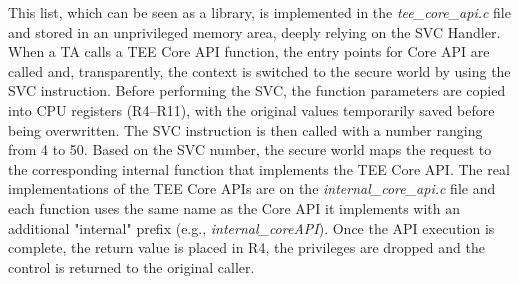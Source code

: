 \documentclass{article}
\begin{document}
This list, which can be seen as a library, is implemented in the \textit{tee\_core\_api.c} file and stored in an unprivileged memory area, deeply relying on the SVC Handler. When a TA calls a TEE Core API function, the entry points for Core API are called and, transparently, the context is switched to the secure world by using the SVC instruction. Before performing the SVC, the function parameters are copied into CPU registers (R4–R11), with the original values temporarily saved before being overwritten. The SVC instruction is then called with a number ranging from 4 to 50. Based on the SVC number, the secure world maps the request to the corresponding internal function that implements the TEE Core API. The real implementations of the TEE Core APIs are on the \textit{internal\_core\_api.c} file and each function uses the same name as the Core API it implements with an additional "internal" prefix (e.g., \textit{internal\_coreAPI}). Once the API execution is complete, the return value is placed in R4, the privileges are dropped and the control is returned to the original caller.
\end{document}
